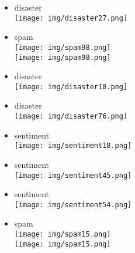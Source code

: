 \documentclass{article}
\theoremstyle{definition}
\theoremstyle{remark}
\begin{document}
\begin{landscape}

\begin{itemize}
    \item disaster\\\texttt{[image: img/disaster27.png]}
    \item spam\\\texttt{[image: img/spam98.png]}\\
        \texttt{[image: img/spam98.png]}
\end{itemize}

\newpage

\begin{itemize}
    \item disaster\\\texttt{[image: img/disaster10.png]}
    \item disaster\\\texttt{[image: img/disaster76.png]}
\end{itemize}

\newpage

\begin{itemize}
    \item sentiment\\\texttt{[image: img/sentiment18.png]}
    \item sentiment\\\texttt{[image: img/sentiment45.png]}
    \item sentiment\\\texttt{[image: img/sentiment54.png]}
\end{itemize}

\newpage

\begin{itemize}
    \item spam\\\texttt{[image: img/spam15.png]}\\
        \texttt{[image: img/spam15.png]}
\end{itemize}

\newpage


\end{landscape}
\end{document}
